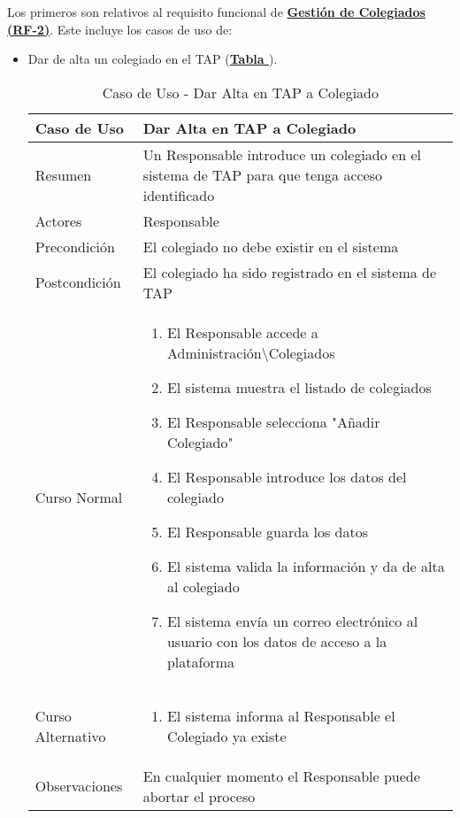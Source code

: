 Los primeros son relativos al requisito funcional de \textbf{\hyperref[tab:rfGestColeg]{Gestión de Colegiados (RF-2)}}. Este incluye los casos de uso de:
\begin{itemize}
	\item \addtocounter{tabla}{1} Dar de alta un colegiado en el TAP (\textbf{\hyperref[tab:curColegAlta]{Tabla }}).
		\begin{table}[!htbp]
		  \centering  \addtocounter{casouso}{1}
		  \begin{tabular}{|l | p{100mm}|}
		    \textbf{Caso de Uso}  & \textbf{Dar Alta en TAP a Colegiado} \\ \hline
		    Resumen 		 & Un Responsable introduce un colegiado en el sistema de TAP para que tenga acceso identificado \\ \hline
		    Actores  		 & Responsable \\ \hline
		    Precondición  	 & El colegiado no debe existir en el sistema  \\ \hline
		    Postcondición  	 & El colegiado ha sido registrado en el sistema de TAP \\ \hline
		    Curso Normal   	 & \begin{enumerate}
			  \item El Responsable accede a Administración\textbackslash Colegiados
			  \item El sistema muestra el listado de colegiados
			  \item El Responsable selecciona "Añadir Colegiado"
			  \item El Responsable introduce los datos del colegiado
			  \item El Responsable guarda los datos
			  \item El sistema valida la información y da de alta al colegiado
			  \item El sistema envía un correo electrónico al usuario con los datos de acceso a la plataforma
		    \end{enumerate}  \\ \hline
		    Curso Alternativo  & \begin{enumerate}
			  \item El sistema informa al Responsable el Colegiado ya existe
		    \end{enumerate}  \\ \hline
		    Observaciones 	 & En cualquier momento el Responsable puede abortar el proceso  \\ \hline
		  \end{tabular}
		  \caption{Caso de Uso  - Dar Alta en TAP a Colegiado}
		  \label{tab:curColegAlta}
		\end{table}
		\FloatBarrier
	

\end{itemize}

